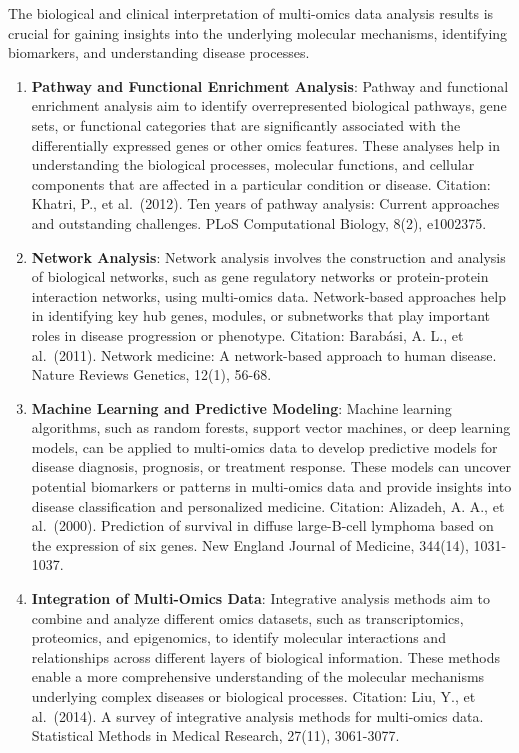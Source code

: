 \documentclass[a4paper, nobind]{templates/ociamthesis}
\begin{document}
The biological and clinical interpretation of multi-omics data analysis results is crucial for gaining insights into the underlying molecular mechanisms, identifying biomarkers, and understanding disease processes.

\begin{enumerate}
\def\labelenumi{\arabic{enumi}.}
\item
  \textbf{Pathway and Functional Enrichment Analysis}: Pathway and functional enrichment analysis aim to identify overrepresented biological pathways, gene sets, or functional categories that are significantly associated with the differentially expressed genes or other omics features. These analyses help in understanding the biological processes, molecular functions, and cellular components that are affected in a particular condition or disease. Citation: Khatri, P., et al.~(2012). Ten years of pathway analysis: Current approaches and outstanding challenges. PLoS Computational Biology, 8(2), e1002375.
\item
  \textbf{Network Analysis}: Network analysis involves the construction and analysis of biological networks, such as gene regulatory networks or protein-protein interaction networks, using multi-omics data. Network-based approaches help in identifying key hub genes, modules, or subnetworks that play important roles in disease progression or phenotype. Citation: Barabási, A. L., et al.~(2011). Network medicine: A network-based approach to human disease. Nature Reviews Genetics, 12(1), 56-68.
\item
  \textbf{Machine Learning and Predictive Modeling}: Machine learning algorithms, such as random forests, support vector machines, or deep learning models, can be applied to multi-omics data to develop predictive models for disease diagnosis, prognosis, or treatment response. These models can uncover potential biomarkers or patterns in multi-omics data and provide insights into disease classification and personalized medicine. Citation: Alizadeh, A. A., et al.~(2000). Prediction of survival in diffuse large-B-cell lymphoma based on the expression of six genes. New England Journal of Medicine, 344(14), 1031-1037.
\item
  \textbf{Integration of Multi-Omics Data}: Integrative analysis methods aim to combine and analyze different omics datasets, such as transcriptomics, proteomics, and epigenomics, to identify molecular interactions and relationships across different layers of biological information. These methods enable a more comprehensive understanding of the molecular mechanisms underlying complex diseases or biological processes. Citation: Liu, Y., et al.~(2014). A survey of integrative analysis methods for multi-omics data. Statistical Methods in Medical Research, 27(11), 3061-3077.

\end{enumerate}
\end{document}
